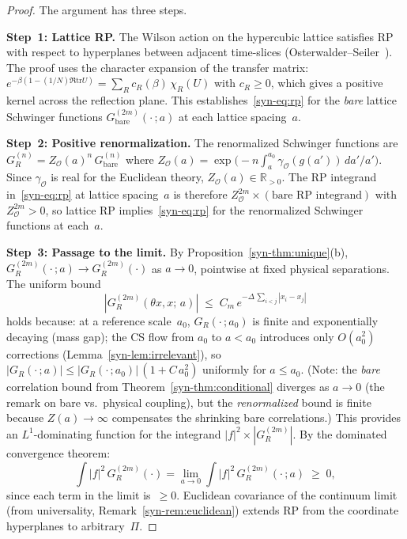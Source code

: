 \documentclass[11pt]{article}
\theoremstyle{definition}
\newcommand{\tr}{\mathrm{tr}}
\newcommand{\R}{\mathbb{R}}
\begin{document}
\begin{proof}
The argument has three steps.

\smallskip
\noindent\textbf{Step~1: Lattice RP.}
The Wilson action on the hypercubic lattice satisfies RP
with respect to hyperplanes between adjacent time-slices
(Osterwalder--Seiler~\cite{OsterwalderSeiler78}).
The proof uses the character expansion of the transfer
matrix: $e^{-\beta(1 - (1/N)\Re\tr U)}
= \sum_R c_R(\beta)\,\chi_R(U)$ with $c_R \geq 0$,
which gives a positive kernel across the reflection
plane.  This establishes~\eqref{syn-eq:rp} for the
\emph{bare} lattice Schwinger functions $G_{\mathrm{bare}}^{(2m)}(\cdot\,;a)$
at each lattice spacing~$a$.

\smallskip
\noindent\textbf{Step~2: Positive renormalization.}
The renormalized Schwinger functions are
$G_R^{(n)} = Z_\mathcal{O}(a)^n\,G_{\mathrm{bare}}^{(n)}$
where $Z_\mathcal{O}(a)
= \exp\!\bigl(-n\!\int_a^{a_0}\!\gamma_\mathcal{O}
(g(a'))\,da'/a'\bigr)$.
Since $\gamma_\mathcal{O}$ is real for the Euclidean
theory, $Z_\mathcal{O}(a) \in \R_{>0}$.
The RP integrand in~\eqref{syn-eq:rp} at lattice
spacing~$a$ is therefore
$Z_\mathcal{O}^{2m} \times (\text{bare RP integrand})$
with $Z_\mathcal{O}^{2m} > 0$, so lattice RP
implies~\eqref{syn-eq:rp} for the renormalized Schwinger
functions at each~$a$.

\smallskip
\noindent\textbf{Step~3: Passage to the limit.}
By Proposition~\ref{syn-thm:unique}(b), $G_R^{(2m)}(\cdot\,;a)
\to G_R^{(2m)}(\cdot)$ as $a \to 0$, pointwise at fixed
physical separations.  The uniform bound
\begin{equation}
  |G_R^{(2m)}(\theta x, x;\, a)|
  \;\leq\; C_m\,e^{-\Delta\,\sum_{i<j}|x_i - x_j|}
\end{equation}
holds because: at a reference scale~$a_0$, $G_R(\cdot\,;a_0)$
is finite and exponentially decaying (mass gap); the CS
flow from $a_0$ to $a < a_0$ introduces only $O(a_0^2)$
corrections (Lemma~\ref{syn-lem:irrelevant}), so
$|G_R(\cdot\,;a)| \leq |G_R(\cdot\,;a_0)|\,(1 + C\,a_0^2)$
uniformly for $a \leq a_0$.
\textup{(}Note: the \emph{bare} correlation bound from
Theorem~\ref{syn-thm:conditional} diverges as $a \to 0$
(the remark on bare vs.\ physical coupling), but the \emph{renormalized}
bound is finite because $Z(a) \to \infty$ compensates
the shrinking bare correlations.\textup{)}
This provides an $L^1$-dominating function
for the integrand $|f|^2 \times |G_R^{(2m)}|$.
By the dominated convergence theorem:
\begin{equation}
  \int |f|^2 \,G_R^{(2m)}(\cdot)
  = \lim_{a \to 0} \int |f|^2\,G_R^{(2m)}(\cdot\,;a)
  \;\geq\; 0,
\end{equation}
since each term in the limit is~$\geq 0$.
Euclidean covariance of the continuum limit (from
universality, Remark~\ref{syn-rem:euclidean}) extends RP
from the coordinate hyperplanes to arbitrary~$\Pi$.
\end{proof}
\end{document}
